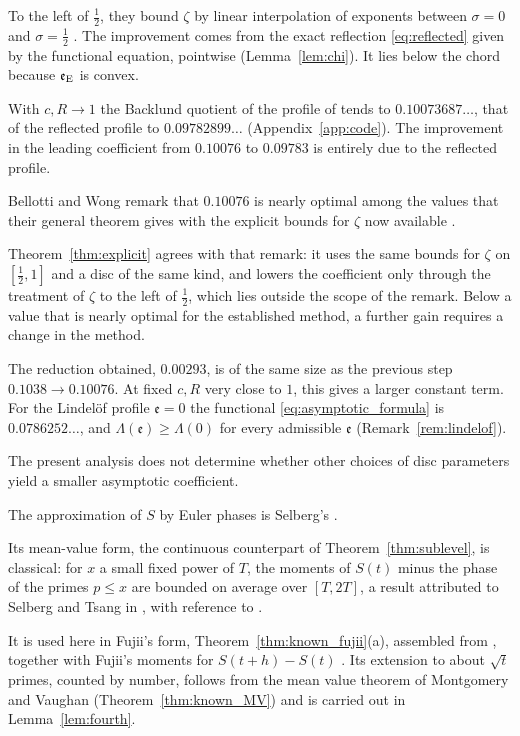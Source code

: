 \documentclass[11pt,a4paper]{article}
\makeatletter
\numberwithin{equation}{section}
\DeclareRobustCommand{\CGref}[1]{\ref{#1}}
\DeclareRobustCommand{\CGeqref}[1]{\eqref{#1}}
\DeclareRobustCommand{\CGcite}[2][]{\if\relax\detokenize{#1}\relax\cite{#2}\else\cite[#1]{#2}\fi}
\let\CG@origref\ref
\let\CG@origeqref\eqref
\newcommand{\CG@gettip}[1]{\@ifundefined{CGTip@#1}{#1}{\csname CGTip@#1\endcsname}}
\newcommand{\CG@getbib}[1]{\@ifundefined{CGBib@#1}{#1}{\csname CGBib@#1\endcsname}}
\DeclareRobustCommand{\CGref}[1]{\pdftooltip{\CG@origref{#1}}{\CG@gettip{#1}}}
\DeclareRobustCommand{\CGeqref}[1]{\pdftooltip{\CG@origeqref{#1}}{\CG@gettip{#1}}}
\DeclareRobustCommand{\CGcite}[2][]{\pdftooltip{\if\relax\detokenize{#1}\relax\cite{#2}\else\cite[#1]{#2}\fi}{\CG@getbib{#2}}}
\theoremstyle{definition}
\theoremstyle{remark}
\newcommand{\eE}{\mathfrak e_{\rm E}}
\makeatother
\begin{document}
To the left of $\frac12$, they bound $\zeta$ by linear interpolation of exponents between $\sigma=0$ and $\sigma=\frac12$ \CGcite[\S3.1]{BellottiWong2025}. The improvement comes from the exact reflection \CGeqref{eq:reflected} given by the functional equation, pointwise (Lemma~\CGref{lem:chi}). It lies below the chord because $\eE$ is convex.

\par
With $c,R\to1$ the Backlund quotient of the profile of \CGcite{BellottiWong2025} tends to $0.10073687\ldots$, that of the reflected profile to $0.09782899\ldots$ (Appendix~\CGref{app:code}). The improvement in the leading coefficient from $0.10076$ to $0.09783$ is entirely due to the reflected profile.

Bellotti and Wong remark that $0.10076$ is nearly optimal among the values that their general theorem gives with the explicit bounds for $\zeta$ now available \CGcite[\S1]{BellottiWong2025}.

Theorem~\CGref{thm:explicit} agrees with that remark: it uses the same bounds for $\zeta$ on $[\frac12,1]$ and a disc of the same kind, and lowers the coefficient only through the treatment of $\zeta$ to the left of $\frac12$, which lies outside the scope of the remark. Below a value that is nearly optimal for the established method, a further gain requires a change in the method.

The reduction obtained, $0.00293$, is of the same size as the previous step $0.1038\to0.10076$. At fixed $c,R$ very close to $1$, this gives a larger constant term. For the Lindel\"of profile $\mathfrak e=0$ the functional \CGeqref{eq:asymptotic_formula} is $0.0786252\ldots$, and $\Lambda(\mathfrak e)\ge\Lambda(0)$ for every admissible $\mathfrak e$ (Remark~\CGref{rem:lindelof}).

The present analysis does not determine whether other choices of disc parameters yield a smaller asymptotic coefficient.

The approximation of $S$ by Euler phases is Selberg's \CGcite{Selberg1946a}.

Its mean-value form, the continuous counterpart of Theorem~\CGref{thm:sublevel}, is classical: for $x$ a small fixed power of $T$, the moments of $S(t)$ minus the phase of the primes $p\le x$ are bounded on average over $[T,2T]$, a result attributed to Selberg and Tsang in \CGcite[\S3, before (3.6)]{FazzariGerspachMinelli2025}, with reference to \CGcite[Thm.~5.1]{Tsang1984}.

It is used here in Fujii's form, Theorem~\CGref{thm:known_fujii}(a), assembled from \CGcite[\S3]{Fujii1974}, together with Fujii's moments for $S(t+h)-S(t)$ \CGcite[Main Theorem]{Fujii1974}. Its extension to about $\sqrt t$ primes, counted by number, follows from the mean value theorem of Montgomery and Vaughan (Theorem~\CGref{thm:known_MV}) and is carried out in Lemma~\CGref{lem:fourth}.
\end{document}
